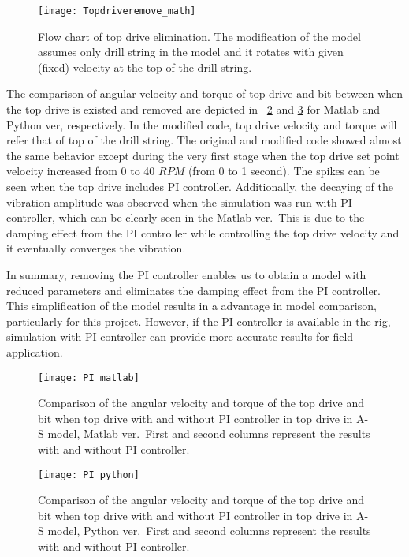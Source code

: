 \begin{figure}
  \centering
  \texttt{[image: Topdriveremove\_math]}
  \caption[Flow chart of top drive elimination]{Flow chart of top drive elimination. The modification of the model assumes only drill string in the model and it rotates with given (fixed) velocity at the top of the drill string.}\label{figure_Topdriveremove_math}
\end{figure}

The comparison of angular velocity and torque of top drive and bit between when the top drive is existed and removed are depicted in \figurename~\ref{figure_topdriveremove_Matlab} and \ref{figure_topdriveremove} for Matlab and Python ver, respectively. In the modified code, top drive velocity and torque will refer that of top of the drill string. The original and modified code showed almost the same behavior except during the very first stage when the top drive set point velocity increased from 0 to 40 $RPM$ (from 0 to 1 second). The spikes can be seen when the top drive includes PI controller. Additionally, the decaying of the vibration amplitude was observed when the simulation was run with PI controller, which can be clearly seen in the Matlab ver.\ This is due to the damping effect from the PI controller while controlling the top drive velocity and it eventually converges the vibration.

In summary, removing the PI controller enables us to obtain a model with reduced parameters and eliminates the damping effect from the PI controller. This simplification of the model results in a advantage in model comparison, particularly for this project. However, if the PI controller is available in the rig, simulation with PI controller can provide more accurate results for field application.
\begin{figure}
  \centering
  \texttt{[image: PI\_matlab]}
  \caption[Comparison between with and without top drive: Matlab ver]{Comparison of the angular velocity and torque of the top drive and bit when top drive with and without PI controller in top drive in A-S model, Matlab ver.\ First and second columns represent the results with and without PI controller.}\label{figure_topdriveremove_Matlab}
\end{figure}

\begin{figure}
  \centering
  \texttt{[image: PI\_python]}
  \caption[Comparison between with and without top drive: Python ver]{Comparison of the angular velocity and torque of the top drive and bit when top drive with and without PI controller in top drive in A-S model, Python ver.\ First and second columns represent the results with and without PI controller.}\label{figure_topdriveremove}
\end{figure}

